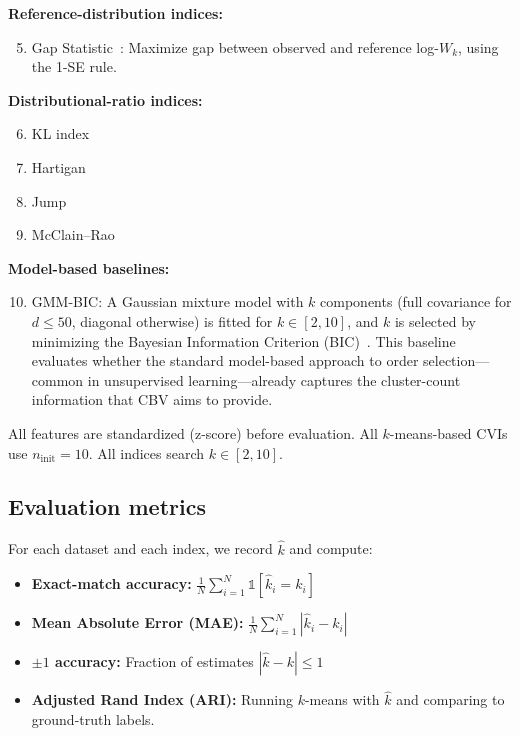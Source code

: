 \documentclass[journal]{IEEEtran}
\begin{document}
\textbf{Reference-distribution indices:}
\begin{enumerate}\setcounter{enumi}{4}
    \item Gap Statistic~\cite{tibshirani2001estimating}: Maximize gap between observed and reference log-$W_k$, using the 1-SE rule.
\end{enumerate}

\textbf{Distributional-ratio indices:}
\begin{enumerate}\setcounter{enumi}{5}
    \item KL index~\cite{krzanowski1988criterion}
    \item Hartigan~\cite{hartigan1975clustering}
    \item Jump~\cite{sugar2003finding}
    \item McClain--Rao~\cite{mcclain1990clustplot}
\end{enumerate}

\textbf{Model-based baselines:}
\begin{enumerate}\setcounter{enumi}{9}
    \item GMM-BIC: A Gaussian mixture model with $k$ components (full covariance for $d \leq 50$, diagonal otherwise) is fitted for $k \in [2, 10]$, and $k$ is selected by minimizing the Bayesian Information Criterion (BIC)~\cite{schwarz1978estimating}. This baseline evaluates whether the standard model-based approach to order selection---common in unsupervised learning---already captures the cluster-count information that CBV aims to provide.
\end{enumerate}

All features are standardized (z-score) before evaluation. All $k$-means-based CVIs use $n_{\mathrm{init}} = 10$. All indices search $k \in [2, 10]$.

\subsection{Evaluation metrics}
\label{sec:metrics}

For each dataset and each index, we record $\hat{k}$ and compute:
\begin{itemize}
    \item \textbf{Exact-match accuracy:} $\frac{1}{N}\sum_{i=1}^{N} \mathbb{1}[\hat{k}_i = k_i]$
    \item \textbf{Mean Absolute Error (MAE):} $\frac{1}{N}\sum_{i=1}^{N} |\hat{k}_i - k_i|$
    \item \textbf{$\pm 1$ accuracy:} Fraction of estimates $|\hat{k} - k| \leq 1$
    \item \textbf{Adjusted Rand Index (ARI):} Running $k$-means with $\hat{k}$ and comparing to ground-truth labels.
\end{itemize}
\end{document}
